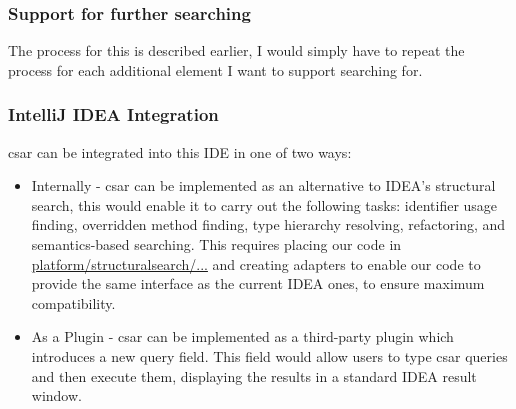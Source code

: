 \documentclass[12pt, letterpaper]{article}
\begin{document}
\subsubsection{Support for further searching}
The process for this is described earlier, I would simply have to repeat the process for each additional element I want to support searching for.

\subsubsection{IntelliJ IDEA Integration}
csar can be integrated into this IDE in one of two ways:
\begin{itemize}
    \item Internally - csar can be implemented as an alternative to IDEA's structural search,
    this would enable it to carry out the following tasks:
    identifier usage finding, overridden method finding, type hierarchy resolving, refactoring, and semantics-based searching.
    This requires placing our code in \href{https://github.com/JetBrains/intellij-community/tree/master/platform/structuralsearch/source/com/intellij/structuralsearch}{platform/structuralsearch/...} and creating adapters to enable our code to provide the same interface as the current IDEA ones, to ensure maximum compatibility.
    \item As a Plugin - csar can be implemented as a third-party plugin which introduces a new query field.
    This field would allow users to type csar queries and then execute them, displaying the results in a standard IDEA result window.
\end{itemize}
\end{document}
